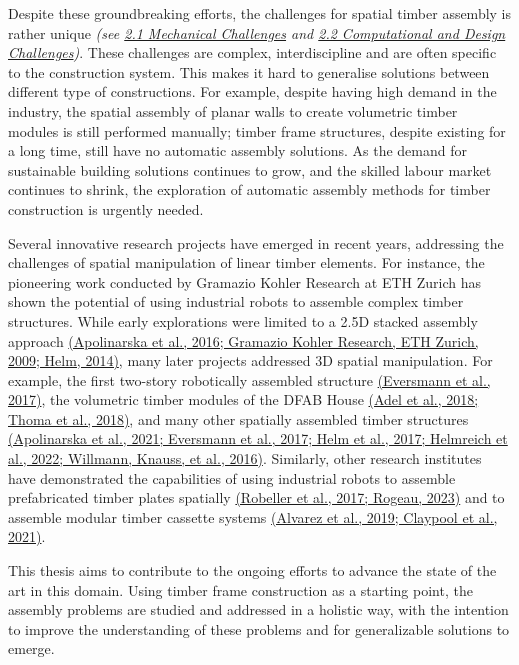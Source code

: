 \documentclass[11pt]{book}
\begin{document}
Despite these groundbreaking efforts, the challenges for spatial timber assembly is rather unique \textit{(see \underline{2.1 Mechanical Challenges} and \underline{2.2 Computational and Design Challenges})}. These challenges are complex, interdiscipline and are often specific to the construction system. This makes it hard to generalise solutions between different type of constructions. For example, despite having high demand in the industry, the spatial assembly of planar walls to create volumetric timber modules is still performed manually; timber frame structures, despite existing for a long time, still have no automatic assembly solutions. As the demand for sustainable building solutions continues to grow, and the skilled labour market continues to shrink, the exploration of automatic assembly methods for timber construction is urgently needed. 

Several innovative research projects have emerged in recent years, addressing the challenges of spatial manipulation of linear timber elements. For instance, the pioneering work conducted by Gramazio Kohler Research at ETH Zurich has shown the potential of using industrial robots to assemble complex timber structures. While early explorations were limited to a 2.5D stacked assembly approach \href{https://www.zotero.org/google-docs/?AEnhNR}{(Apolinarska et al., 2016; Gramazio Kohler Research, ETH Zurich, 2009; Helm, 2014)}, many later projects addressed 3D spatial manipulation. For example, the first two-story robotically assembled structure \href{https://www.zotero.org/google-docs/?eAx4Aa}{(Eversmann et al., 2017)}, the volumetric timber modules of the DFAB House \href{https://www.zotero.org/google-docs/?vY9d9P}{(Adel et al., 2018; Thoma et al., 2018)}, and many other spatially assembled timber structures \href{https://www.zotero.org/google-docs/?QdvzIq}{(Apolinarska et al., 2021; Eversmann et al., 2017; Helm et al., 2017; Helmreich et al., 2022; Willmann, Knauss, et al., 2016)}. Similarly, other research institutes have demonstrated the capabilities of using industrial robots to assemble prefabricated timber plates spatially \href{https://www.zotero.org/google-docs/?4viP1e}{(Robeller et al., 2017; Rogeau, 2023)} and to assemble modular timber cassette systems \href{https://www.zotero.org/google-docs/?X8rvKb}{(Alvarez et al., 2019; Claypool et al., 2021)}. 

This thesis aims to contribute to the ongoing efforts to advance the state of the art in this domain. Using timber frame construction as a starting point, the assembly problems are studied and addressed in a holistic way, with the intention to improve the understanding of these problems and for generalizable solutions to emerge.
\end{document}
